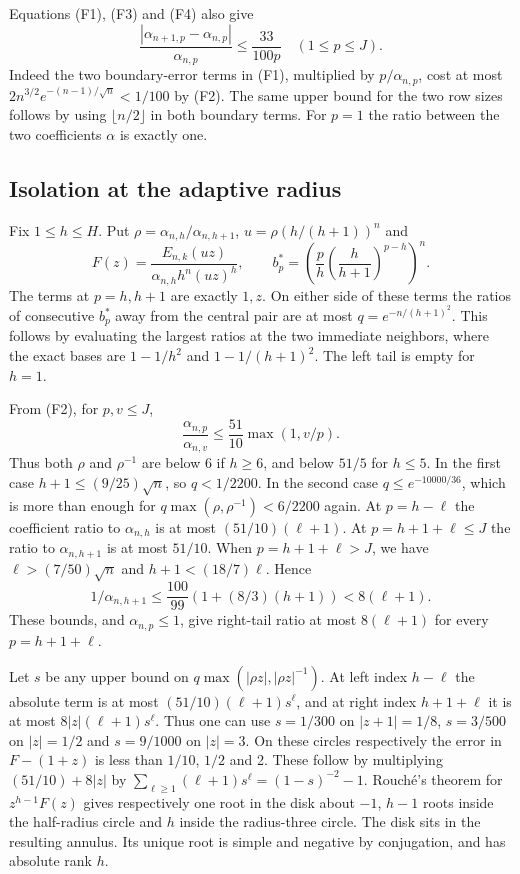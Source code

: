 Equations (F1), (F3) and (F4) also give
\[
\frac{|\alpha_{n+1,p}-\alpha_{n,p}|}{\alpha_{n,p}}\le \frac{33}{100p}
\quad(1\le p\le J).
\tag{F5}
\]
Indeed the two boundary-error terms in (F1), multiplied by $p/\alpha_{n,p}$, cost at most $2 n^{3/2}e^{-(n-1)/\sqrt n}<1/100$ by (F2). The same upper bound for the two row sizes follows by using $\lfloor n/2\rfloor$ in both boundary terms. For $p=1$ the ratio between the two coefficients $\alpha$ is exactly one.

\subsection{Isolation at the adaptive radius}

Fix $1\le h\le H$. Put $\rho=\alpha_{n,h}/\alpha_{n,h+1}$, $u=\rho(h/(h+1))^n$ and
\[
F(z)=\frac{E_{n,k}(uz)}{\alpha_{n,h}h^n(uz)^h},
\qquad
b_p^*=\left(\frac ph\left(\frac h{h+1}\right)^{p-h}\right)^n.
\]
The terms at $p=h,h+1$ are exactly $1,z$. On either side of these terms the ratios of consecutive $b_p^*$ away from the central pair are at most $q=e^{-n/(h+1)^2}$. This follows by evaluating the largest ratios at the two immediate neighbors, where the exact bases are $1-1/h^2$ and $1-1/(h+1)^2$. The left tail is empty for $h=1$.

From (F2), for $p,v\le J$,
\[
\frac{\alpha_{n,p}}{\alpha_{n,v}}
\le \frac{51}{10}\max(1,v/p).
\]
Thus both $\rho$ and $\rho^{-1}$ are below 6 if $h\ge6$, and below $51/5$ for $h\le5$. In the first case $h+1\le(9/25)\sqrt n$, so $q<1/2200$. In the second case $q\le e^{-10000/36}$, which is more than enough for $q\max(\rho,\rho^{-1})<6/2200$ again. At $p=h-\ell$ the coefficient ratio to $\alpha_{n,h}$ is at most $(51/10)(\ell+1)$. At $p=h+1+\ell\le J$ the ratio to $\alpha_{n,h+1}$ is at most $51/10$. When $p=h+1+\ell>J$, we have $\ell>(7/50)\sqrt n$ and $h+1<(18/7)\ell$. Hence
\[
1/\alpha_{n,h+1}\le\frac{100}{99}(1+(8/3)(h+1))<8(\ell+1).
\]
These bounds, and $\alpha_{n,p}\le1$, give right-tail ratio at most $8(\ell+1)$ for every $p=h+1+\ell$.

Let $s$ be any upper bound on $q\max(|\rho z|,|\rho z|^{-1})$. At left index $h-\ell$ the absolute term is at most $(51/10)(\ell+1)s^\ell$, and at right index $h+1+\ell$ it is at most $8|z|(\ell+1)s^\ell$. Thus one can use $s=1/300$ on $|z+1|=1/8$, $s=3/500$ on $|z|=1/2$ and $s=9/1000$ on $|z|=3$. On these circles respectively the error in $F-(1+z)$ is less than $1/10$, $1/2$ and 2. These follow by multiplying $(51/10)+8|z|$ by $\sum_{\ell\ge1}(\ell+1)s^\ell=(1-s)^{-2}-1$. Rouché's theorem for $z^{h-1}F(z)$ gives respectively one root in the disk about $-1$, $h-1$ roots inside the half-radius circle and $h$ inside the radius-three circle. The disk sits in the resulting annulus. Its unique root is simple and negative by conjugation, and has absolute rank $h$.

